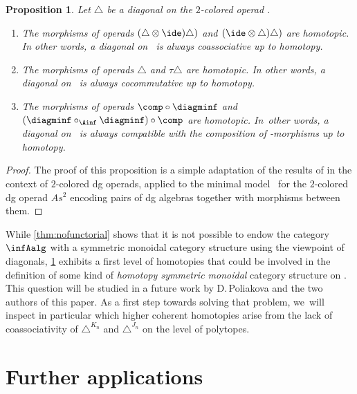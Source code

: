 \documentclass[JEP,XML,SOM,NoFloatCountersInSection,Unicode,published]{cedram}
\theoremstyle{definition}
\theoremstyle{plain}
\newtheorem{proposition}[definition]{Proposition}
\begin{document}
\begin{proposition}
\label{th:homotopy-properties}
Let $\triangle$ be a diagonal on the $2$-colored operad \Ainfdeux.
\begin{enumerate}
\item\label{th:homotopy-properties1} The morphisms of operads $(\triangle \otimes \ide) \triangle)$ and $(\ide \otimes \triangle) \triangle)$ are homotopic. In other words, a diagonal on \Ainfdeux\ is always coassociative up to homotopy.
\item\label{th:homotopy-properties2} The morphisms of operads $\triangle$ and $\tau \triangle$ are homotopic. In other words, a diagonal on \Ainfdeux\ is always cocommutative up to homotopy.
\item\label{th:homotopy-properties3} The morphisms of operads $\comp \circ \diagminf$ and $(\diagminf \circ_{\Ainf} \diagminf) \circ \comp$ are homotopic. In~other words, a diagonal on \Ainfdeux\ is always compatible with the composition of \Ainf\nobreakdash-mor\-phisms up to homotopy.
\end{enumerate}
\end{proposition}

\begin{proof}
The proof of this proposition is a simple adaptation of the results of \cite[\S 2]{MarklShnider06} in the context of $2$-colored dg operads, applied to the minimal model \Ainfdeux\ for the $2$-colored dg operad $As^2$ encoding pairs of dg algebras together with morphisms between them.
\end{proof}

While \cref{thm:nofunctorial} shows that it is not possible to endow the category $\infAalg$ with a symmetric monoidal category structure using the viewpoint of diagonals, \cref{th:homotopy-properties} exhibits a first level of homotopies that could be involved in the definition of some kind of \textit{homotopy symmetric monoidal} category structure on \infAalg.
This question will be studied in a future work by D.\,Poliakova and the two authors of this paper. As a first step towards solving that problem, we~will inspect in particular which higher coherent homotopies arise from the lack of coassociativity of $\triangle^{K_n}$ and $\triangle^{J_n}$ on the level of polytopes.

\section{Further applications} \label{sec:V}
\end{document}
